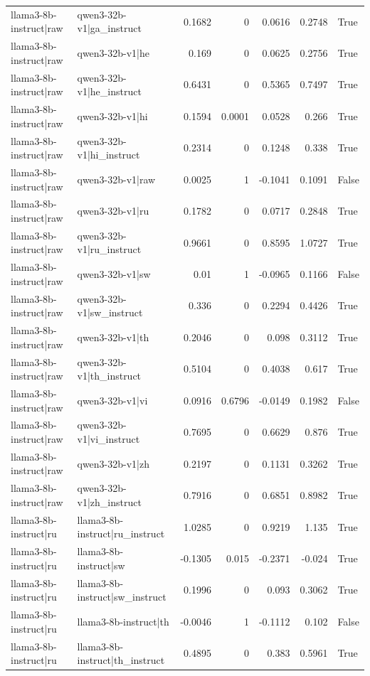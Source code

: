 \begin{table}
\begin{tabular}{l l r r r r l}
llama3-8b-instruct|raw & qwen3-32b-v1|ga_instruct & 0.1682 & 0 & 0.0616 & 0.2748 & True \\
llama3-8b-instruct|raw & qwen3-32b-v1|he & 0.169 & 0 & 0.0625 & 0.2756 & True \\
llama3-8b-instruct|raw & qwen3-32b-v1|he_instruct & 0.6431 & 0 & 0.5365 & 0.7497 & True \\
llama3-8b-instruct|raw & qwen3-32b-v1|hi & 0.1594 & 0.0001 & 0.0528 & 0.266 & True \\
llama3-8b-instruct|raw & qwen3-32b-v1|hi_instruct & 0.2314 & 0 & 0.1248 & 0.338 & True \\
llama3-8b-instruct|raw & qwen3-32b-v1|raw & 0.0025 & 1 & -0.1041 & 0.1091 & False \\
llama3-8b-instruct|raw & qwen3-32b-v1|ru & 0.1782 & 0 & 0.0717 & 0.2848 & True \\
llama3-8b-instruct|raw & qwen3-32b-v1|ru_instruct & 0.9661 & 0 & 0.8595 & 1.0727 & True \\
llama3-8b-instruct|raw & qwen3-32b-v1|sw & 0.01 & 1 & -0.0965 & 0.1166 & False \\
llama3-8b-instruct|raw & qwen3-32b-v1|sw_instruct & 0.336 & 0 & 0.2294 & 0.4426 & True \\
llama3-8b-instruct|raw & qwen3-32b-v1|th & 0.2046 & 0 & 0.098 & 0.3112 & True \\
llama3-8b-instruct|raw & qwen3-32b-v1|th_instruct & 0.5104 & 0 & 0.4038 & 0.617 & True \\
llama3-8b-instruct|raw & qwen3-32b-v1|vi & 0.0916 & 0.6796 & -0.0149 & 0.1982 & False \\
llama3-8b-instruct|raw & qwen3-32b-v1|vi_instruct & 0.7695 & 0 & 0.6629 & 0.876 & True \\
llama3-8b-instruct|raw & qwen3-32b-v1|zh & 0.2197 & 0 & 0.1131 & 0.3262 & True \\
llama3-8b-instruct|raw & qwen3-32b-v1|zh_instruct & 0.7916 & 0 & 0.6851 & 0.8982 & True \\
llama3-8b-instruct|ru & llama3-8b-instruct|ru_instruct & 1.0285 & 0 & 0.9219 & 1.135 & True \\
llama3-8b-instruct|ru & llama3-8b-instruct|sw & -0.1305 & 0.015 & -0.2371 & -0.024 & True \\
llama3-8b-instruct|ru & llama3-8b-instruct|sw_instruct & 0.1996 & 0 & 0.093 & 0.3062 & True \\
llama3-8b-instruct|ru & llama3-8b-instruct|th & -0.0046 & 1 & -0.1112 & 0.102 & False \\
llama3-8b-instruct|ru & llama3-8b-instruct|th_instruct & 0.4895 & 0 & 0.383 & 0.5961 & True \\

\end{tabular}
\end{table}
